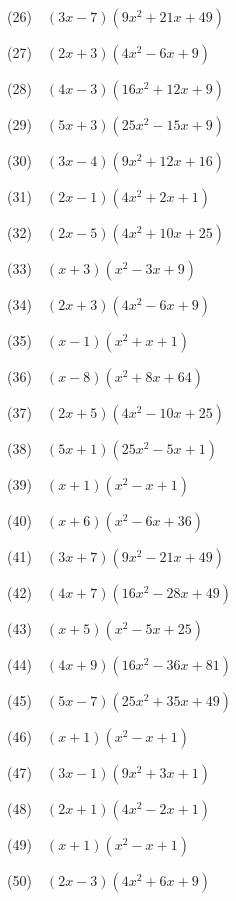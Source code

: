 \documentclass[a4j,twocolumn,10pt,fleqn]{jarticle}
\begin{document}
(26)~~$\left(3 x - 7\right) \left(9 x^{2} + 21 x + 49\right)$

(27)~~$\left(2 x + 3\right) \left(4 x^{2} - 6 x + 9\right)$

(28)~~$\left(4 x - 3\right) \left(16 x^{2} + 12 x + 9\right)$

(29)~~$\left(5 x + 3\right) \left(25 x^{2} - 15 x + 9\right)$

(30)~~$\left(3 x - 4\right) \left(9 x^{2} + 12 x + 16\right)$

(31)~~$\left(2 x - 1\right) \left(4 x^{2} + 2 x + 1\right)$

(32)~~$\left(2 x - 5\right) \left(4 x^{2} + 10 x + 25\right)$

(33)~~$\left(x + 3\right) \left(x^{2} - 3 x + 9\right)$

(34)~~$\left(2 x + 3\right) \left(4 x^{2} - 6 x + 9\right)$

(35)~~$\left(x - 1\right) \left(x^{2} + x + 1\right)$

(36)~~$\left(x - 8\right) \left(x^{2} + 8 x + 64\right)$

(37)~~$\left(2 x + 5\right) \left(4 x^{2} - 10 x + 25\right)$

(38)~~$\left(5 x + 1\right) \left(25 x^{2} - 5 x + 1\right)$

(39)~~$\left(x + 1\right) \left(x^{2} - x + 1\right)$

(40)~~$\left(x + 6\right) \left(x^{2} - 6 x + 36\right)$

(41)~~$\left(3 x + 7\right) \left(9 x^{2} - 21 x + 49\right)$

(42)~~$\left(4 x + 7\right) \left(16 x^{2} - 28 x + 49\right)$

(43)~~$\left(x + 5\right) \left(x^{2} - 5 x + 25\right)$

(44)~~$\left(4 x + 9\right) \left(16 x^{2} - 36 x + 81\right)$

(45)~~$\left(5 x - 7\right) \left(25 x^{2} + 35 x + 49\right)$

(46)~~$\left(x + 1\right) \left(x^{2} - x + 1\right)$

(47)~~$\left(3 x - 1\right) \left(9 x^{2} + 3 x + 1\right)$

(48)~~$\left(2 x + 1\right) \left(4 x^{2} - 2 x + 1\right)$

(49)~~$\left(x + 1\right) \left(x^{2} - x + 1\right)$

(50)~~$\left(2 x - 3\right) \left(4 x^{2} + 6 x + 9\right)$
\end{document}
